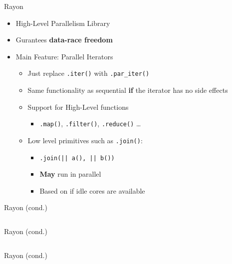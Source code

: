 \documentclass[compress,aspectratio=169]{beamer}
\begin{document}
\begin{frame}{Rayon \cite{rayon}}
  \begin{itemize}
    \item High-Level Parallelism Library
    \item Gurantees \textbf{data-race freedom}
    \item Main Feature: Parallel Iterators
      \begin{itemize}
        \item Just replace \texttt{.iter()} with \texttt{.par\_iter()}
        \item Same functionality as sequential \textbf{if} the iterator has no side effects
        \item Support for High-Level functions
          \begin{itemize}
            \item \texttt{.map()}, \texttt{.filter()}, \texttt{.reduce()} \dots
          \end{itemize}
        \item Low level primitives such as \texttt{.join()}:
          \begin{itemize}
            \item \texttt{.join(|| a(), || b())}
            \item \textbf{May} run in parallel
            \item Based on if idle cores are available
          \end{itemize}
      \end{itemize}
  \end{itemize}
\end{frame}

\begin{frame}{Rayon (cond.)}
  \begin{tcolorbox}[title=Unported Code (no transpose)]
    \footnotesize\inputminted[xleftmargin=1em,linenos]{rust}{./assets/01rayon.rs}
  \end{tcolorbox}
\end{frame}

\begin{frame}{Rayon (cond.)}
  \begin{tcolorbox}[title=Ported to Iterators]
    \footnotesize\inputminted[xleftmargin=1em,linenos]{rust}{./assets/02rayon.rs}
  \end{tcolorbox}
\end{frame}

\begin{frame}{Rayon (cond.)}
  \begin{tcolorbox}[title=Ported to Iterators \textbf{and Parallelized!}]
    \footnotesize\inputminted[xleftmargin=1em,linenos]{rust}{./assets/03rayon.rs}
  \end{tcolorbox}
\end{frame}
\end{document}
